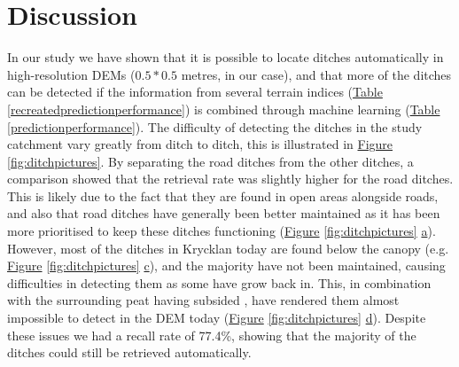 \documentclass[]{interact}
\theoremstyle{plain}%
\theoremstyle{definition}
\theoremstyle{remark}
\begin{document}
\section{Discussion}

In our study we have shown that it is possible to locate ditches automatically in high-resolution DEMs ($0.5  * 0.5 $ metres, in our case), and that more of the ditches can be detected if the information from several terrain indices (\hyperref[recreatedpredictionperformance]{Table} \ref{recreatedpredictionperformance}) is combined through machine learning (\hyperref[predictionperformance]{Table} \ref{predictionperformance}).
The difficulty of detecting the ditches in the study catchment vary greatly from ditch to ditch, this is illustrated in \hyperref[fig:ditchpictures]{Figure} \ref{fig:ditchpictures}.
By separating the road ditches from the other ditches, a comparison showed that the retrieval rate was slightly higher for the road ditches. This is likely due to the fact that they are found in open areas alongside roads, and also that road ditches have generally been better maintained as it has been more prioritised to keep these ditches functioning (\hyperref[fig:ditchpictures]{Figure} \ref{fig:ditchpictures} \hyperref[fig:ditchpictures]{a}). However, most of the ditches in Krycklan today are found below the canopy (e.g. \hyperref[fig:ditchpictures]{Figure} \ref{fig:ditchpictures} \hyperref[fig:ditchpictures]{c}), and the majority have not been maintained, causing difficulties in detecting them as some have grow back in. This, in combination with the surrounding peat having subsided \citep{heikurainen}, have rendered them almost impossible to detect in the DEM today (\hyperref[fig:ditchpictures]{Figure} \ref{fig:ditchpictures} \hyperref[fig:ditchpictures]{d}). Despite these issues we had a recall rate of 77.4\%, showing that the majority of the ditches could still be retrieved automatically.
\end{document}
